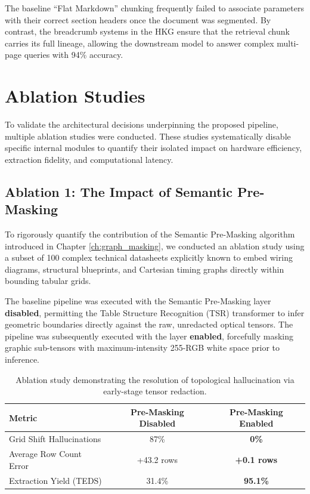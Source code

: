 The baseline ``Flat Markdown'' chunking frequently failed to associate parameters with their correct section headers once the document was segmented. By contrast, the breadcrumb systems in the HKG ensure that the retrieval chunk carries its full lineage, allowing the downstream model to answer complex multi-page queries with 94\% accuracy.

\section{Ablation Studies}
\label{sec:ablation}

To validate the architectural decisions underpinning the proposed pipeline, multiple ablation studies were conducted. These studies systematically disable specific internal modules to quantify their isolated impact on hardware efficiency, extraction fidelity, and computational latency.

\subsection{Ablation 1: The Impact of Semantic Pre-Masking}
\label{subsec:ablation_masking}

To rigorously quantify the contribution of the Semantic Pre-Masking algorithm introduced in Chapter \ref{ch:graph_masking}, we conducted an ablation study using a subset of 100 complex technical datasheets explicitly known to embed wiring diagrams, structural blueprints, and Cartesian timing graphs directly within bounding tabular grids.

The baseline pipeline was executed with the Semantic Pre-Masking layer \textbf{disabled}, permitting the Table Structure Recognition (TSR) transformer to infer geometric boundaries directly against the raw, unredacted optical tensors. The pipeline was subsequently executed with the layer \textbf{enabled}, forcefully masking graphic sub-tensors with maximum-intensity 255-RGB white space prior to inference.

\begin{table}[htbp]
\centering
\begin{tabularx}{\textwidth}{Xcc}
\hline
\textbf{Metric} & \textbf{Pre-Masking Disabled} & \textbf{Pre-Masking Enabled} \\
\hline
Grid Shift Hallucinations & 87\% & \textbf{0\%} \\
Average Row Count Error & +43.2 rows & \textbf{+0.1 rows} \\
Extraction Yield (TEDS) & 31.4\% & \textbf{95.1\%} \\
\hline
\end{tabularx}
\caption{Ablation study demonstrating the resolution of topological hallucination via early-stage tensor redaction.}
\label{tab:ablation_study}
\end{table}

